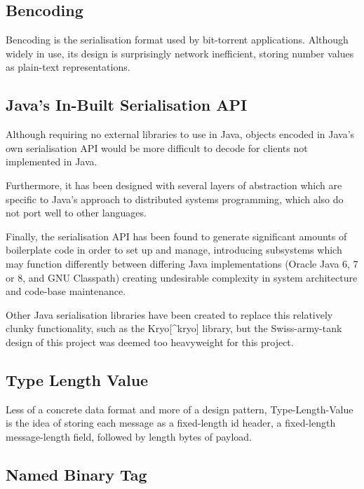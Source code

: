 \documentclass[12pt,a4paper,]{adreport}
\begin{document}
\subsection{Bencoding}\label{bencoding}

Bencoding is the serialisation format used by bit-torrent applications.
Although widely in use, its design is surprisingly network inefficient,
storing number values as plain-text representations.

\subsection{Java's In-Built Serialisation
API}\label{javas-in-built-serialisation-api}

Although requiring no external libraries to use in Java, objects encoded
in Java's own serialisation API would be more difficult to decode for
clients not implemented in Java.

Furthermore, it has been designed with several layers of abstraction
which are specific to Java's approach to distributed systems
programming, which also do not port well to other languages.

Finally, the serialisation API has been found to generate significant
amounts of boilerplate code in order to set up and manage, introducing
subsystems which may function differently between differing Java
implementations (Oracle Java 6, 7 or 8, and GNU Classpath) creating
undesirable complexity in system architecture and code-base maintenance.

Other Java serialisation libraries have been created to replace this
relatively clunky functionality, such as the Kryo{[}\^{}kryo{]} library,
but the Swiss-army-tank design of this project was deemed too
heavyweight for this project.

\subsection{Type Length Value}\label{type-length-value}

Less of a concrete data format and more of a design pattern,
Type-Length-Value is the idea of storing each message as a fixed-length
id header, a fixed-length message-length field, followed by length bytes
of payload.

\subsection{Named Binary Tag}\label{named-binary-tag}
\end{document}
